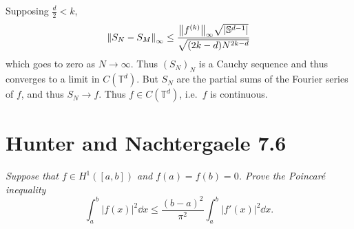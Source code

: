 \documentclass[paper=a4, fontsize=11pt]{scrartcl} %
\theoremstyle{plain}
\numberwithin{equation}{section} %
\numberwithin{figure}{section} %
\numberwithin{table}{section} %
\begin{document}
Supposing $\frac{d}{2} < k$,
\begin{align*}
    \norm{S_N - S_M}_\infty \leq \frac{\norm{f^{(k)}}_\infty\sqrt{|\mathbb{S}^{d-1}|}}{\sqrt{(2k-d)N^{2k-d}}}
\end{align*}
which goes to zero as $N \rightarrow \infty$.  Thus $(S_N)_N$ is a Cauchy sequence and thus converges to a limit in $C(\mathbb{T}^d)$.  But $S_N$ are the partial sums of the Fourier series of $f$, and thus $S_N \rightarrow f$.  Thus $f \in C(\mathbb{T}^d)$, i.e.~$f$ is continuous.

\section{Hunter and Nachtergaele 7.6}
\emph{Suppose that $f \in H^1([a,b])$ and $f(a) = f(b) = 0$.  Prove the \emph{Poincar\'{e} inequality} $$\int_a^b|f(x)|^2 \dd x \leq \frac{(b-a)^2}{\pi^2}\int_a^b|f'(x)|^2 \dd x.$$}
\end{document}
